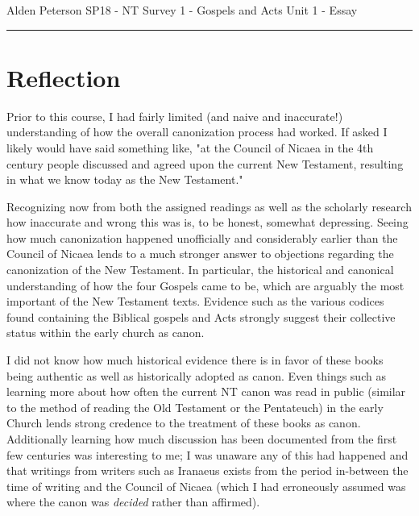 \documentclass[12pt]{turabian-researchpaper}
\begin{document}
\begin{singlespace}
\noindent Alden Peterson \newline
\noindent SP18 - NT Survey 1 - Gospels and Acts\newline
\noindent Unit 1 - Essay  \newline
\noindent\rule{4cm}{0.4pt}
\end{singlespace}




\section{Reflection}
Prior to this course, I had fairly limited (and naive and inaccurate!) understanding of how the overall canonization process had worked. If asked I likely would have said something like, "at the Council of Nicaea in the 4th century people discussed and agreed upon the current New Testament, resulting in what we know today as the New Testament." 

Recognizing now from both the assigned readings as well as the scholarly research how inaccurate and wrong this was is, to be honest, somewhat depressing. Seeing how much canonization happened unofficially and considerably earlier than the Council of Nicaea lends to a much stronger answer to objections regarding the canonization of the New Testament. In particular, the historical and canonical understanding of how the four Gospels came to be, which are arguably the most important of the New Testament texts. Evidence such as the various codices found containing the Biblical gospels and Acts strongly suggest their collective status within the early church as canon.

I did not know how much historical evidence there is in favor of these books being authentic as well as historically adopted as canon. Even things such as learning more about how often the current NT canon was read in public (similar to the method of reading the Old Testament or the Pentateuch) in the early Church lends strong credence to the treatment of these books as canon. Additionally learning how much discussion has been documented from the first few centuries was interesting to me; I was unaware any of this had happened and that writings from writers such as Iranaeus exists from the period in-between the time of writing and the Council of Nicaea (which I had erroneously assumed was where the canon was \textit{decided} rather than affirmed).
\end{document}
